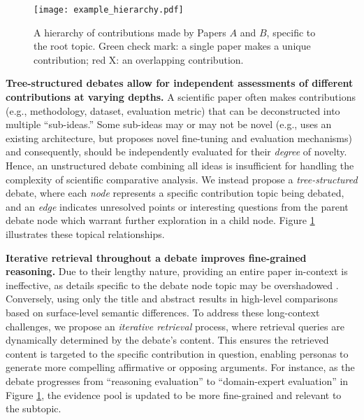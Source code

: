     \begin{figure}
        \centering
        \texttt{[image: example\_hierarchy.pdf]}
        \caption{A hierarchy of contributions made by Papers $A$ and $B$, specific to the root topic. Green check mark: a single paper makes a unique contribution; red X: an overlapping contribution.}
        \label{fig:hierarchy}
        \vspace{-0.6cm}
    \end{figure}

\par{\textbf{Tree-structured debates allow for independent assessments of different contributions at varying depths.}} A scientific paper often makes contributions (e.g., methodology, dataset, evaluation metric) that can be deconstructed into multiple ``sub-ideas.'' Some sub-ideas may or may not be novel (e.g., uses an existing architecture, but proposes novel fine-tuning and evaluation mechanisms) and consequently, should be independently evaluated for their \textit{degree} of novelty. Hence, an unstructured debate combining all ideas is insufficient for handling the complexity of scientific comparative analysis. We instead propose a \textit{tree-structured} debate, where each \textit{node} represents a specific contribution topic being debated, and an \textit{edge} indicates unresolved points or interesting questions from the parent debate node which warrant further exploration in a child node. Figure \ref{fig:hierarchy} illustrates these topical relationships.

\par{\textbf{Iterative retrieval throughout a debate improves fine-grained reasoning.}} Due to their lengthy nature, providing an entire paper in-context is ineffective, as details specific to the debate node topic may be overshadowed \cite{li-etal-2024-loogle}. Conversely, using only the title and abstract results in high-level comparisons based on surface-level semantic differences. To address these long-context challenges, we propose an \textit{iterative retrieval} process, where retrieval queries are dynamically determined by the debate's content. This ensures the retrieved content is targeted to the specific contribution in question, enabling personas to generate more compelling affirmative or opposing arguments. For instance, as the debate progresses from ``reasoning evaluation'' to ``domain-expert evaluation'' in Figure \ref{fig:hierarchy}, the evidence pool is updated to be more fine-grained and relevant to the subtopic.

